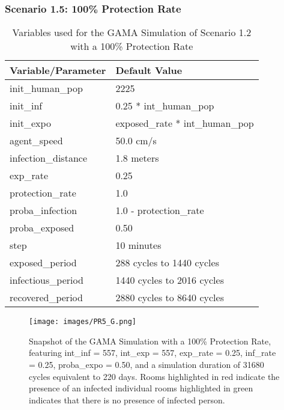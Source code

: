 \subsubsection{Scenario 1.5: 100\% Protection Rate}
\begin{table}[H]
	\centering
	{\begin{tabular}{ll}
			\toprule
			\textbf{Variable/Parameter} & \textbf{Default Value}\\
			\hline
			init\_human\_pop & 2225\\
			init\_inf & 0.25 * int\_human\_pop\\
			init\_expo & exposed\_rate * int\_human\_pop \\
			agent\_speed & 50.0 cm/s\\
			infection\_distance & 1.8 meters\\
			exp\_rate & 0.25\\
			protection\_rate & 1.0\\
			proba\_infection & 1.0 - protection\_rate\\
			proba\_exposed & 0.50\\
			step & 10 minutes\\
			exposed\_period & 288 cycles to 1440 cycles\\
			infectious\_period & 1440 cycles to 2016 cycles\\
			recovered\_period & 2880 cycles to 8640 cycles\\ 
			\bottomrule
		\end{tabular}
		\caption{Variables used for the GAMA Simulation of Scenario 1.2 with a 100\% Protection Rate}
		\label{1.5}}
\end{table}

\begin{figure}[H]
	\centering
	\texttt{[image: images/PR5\_G.png]}
	\caption{Snapshot of the GAMA Simulation with a 100\% Protection Rate, featuring int\_inf = 557, int\_exp = 557, exp\_rate = 0.25, inf\_rate = 0.25, proba\_expo = 0.50, and a simulation duration of 31680 cycles equivalent to 220 days. Rooms highlighted in red indicate the presence of an infected individual rooms highlighted in green indicates that there is no presence of infected person.}
	\label{PR5G}
\end{figure}

